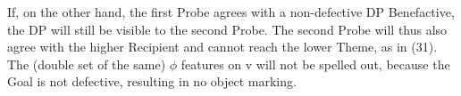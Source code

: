 \documentclass[output=paper
,modfonts
,nonflat]{langsci/langscibook}
\begin{document}
\begin{figure}[!h]
\begin{exe}
\end{exe} 
\end{figure} \noindent
If, on the other hand, the first Probe agrees with a non-defective DP Benefactive, the DP will still be visible to the second Probe. The second Probe will thus also agree with the higher Recipient and cannot reach the lower Theme, as in (31). The (double set of the same) $\phi$ features on v will not be spelled out, because the Goal is not defective, resulting in no object marking.
\end{document}
